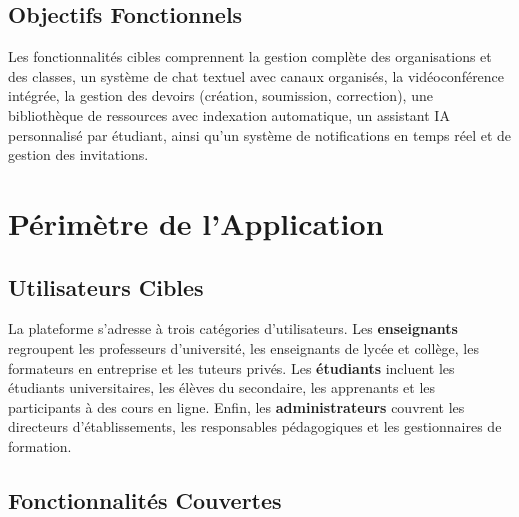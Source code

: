 \documentclass[12pt, a4paper, twoside]{report}
\begin{document}
\subsection{Objectifs Fonctionnels}

Les fonctionnalités cibles comprennent la gestion complète des organisations et
des classes, un système de chat textuel avec canaux organisés, la vidéoconférence
intégrée, la gestion des devoirs (création, soumission, correction), une
bibliothèque de ressources avec indexation automatique, un assistant IA personnalisé
par étudiant, ainsi qu'un système de notifications en temps réel et de gestion des
invitations.

\section{Périmètre de l'Application}

\subsection{Utilisateurs Cibles}

La plateforme  s'adresse à trois catégories d'utilisateurs. Les
\textbf{enseignants} regroupent les professeurs d'université, les enseignants de
lycée et collège, les formateurs en entreprise et les tuteurs privés. Les
\textbf{étudiants} incluent les étudiants universitaires, les élèves du secondaire,
les apprenants  et les participants à des cours en ligne.
Enfin, les \textbf{administrateurs} couvrent les directeurs d'établissements, les
responsables pédagogiques et les gestionnaires de formation.

\subsection{Fonctionnalités Couvertes}
\end{document}
